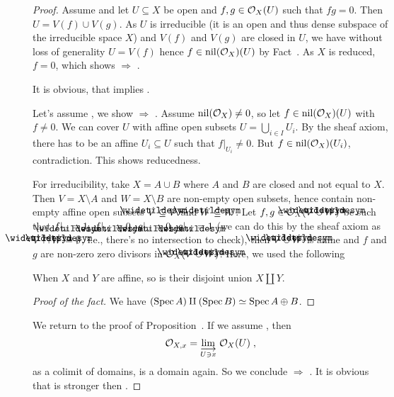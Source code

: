 \documentclass[a4paper,parskip=half,numbers=enddot, DIV=12]{scrreprt}
\begin{document}
\begin{proof}
    Assume  and let $U\subseteq X$ be open and $f,g\in \mathcal{O}_X(U)$ such that $fg = 0$. Then $U = V(f)\cup V(g)$. As $U$ is irreducible (it is an open and thus dense subspace of the irreducible space $X$) and $V(f)$ and $V(g)$ are closed in $U$, we have without loss of generality $U = V(f)$ hence $f\in\operatorname{nil}(\mathcal{O}_X)(U)$ by Fact~. As $X$ is reduced, $f=0$, which shows  $\Rightarrow$ .
    
    It is obvious, that  implies .
    
    Let's assume , we show  $\Rightarrow$ . Assume $\operatorname{nil}(\mathcal{O}_X) \neq 0$, so let $f\in \operatorname{nil}(\mathcal{O}_X)(U)$ with $f\neq 0$. We can cover $U$ with affine open subsets $U=\bigcup_{i\in I}U_i$. By the sheaf axiom, there has to be an affine $U_i \subseteq U$ such that $f|_{U_i} \neq 0$. But $f\in \operatorname{nil}(\mathcal{O}_X)(U_i)$, contradiction. This shows reducedness. 
    
    For irreducibility, take $X=A\cup B$ where $A$ and $B$ are closed and not equal to $X$. Then $V=X\setminus A$ and $W= X\setminus B$ are non-empty open subsets, hence contain non-empty affine open subsets $\snake V \subseteq V$ and $\snake W \subseteq W$. Let $f,g\in \Oo_X(\snake V\cup\snake W)$ be such that $f|_{\snake V} = 1$, $f|_{\snake W} = 0$, $g|_{\snake V} = 0$, $g|_{\snake W} = 1$ (we can do this by the sheaf axiom as $\snake V\cap\snake W=\emptyset$, i.e., there's no intersection to check), then $\snake V\cup \snake W$ is affine and $f$ and $g$ are non-zero zero divisors in $\Oo_X(\snake V\cup \snake W)$. Here, we used the following 
    \begin{fact*}
    	When $X$ and $Y$ are affine, so is their disjoint union $X\amalg Y$.
    \end{fact*}
    \begin{proof}[Proof of the fact] 
    	We have $(\operatorname{Spec} A) \amalg (\operatorname{Spec} B) \simeq \operatorname{Spec} A\oplus B$.
    \end{proof}
    
    We return to the proof of Proposition~. If we assume , then 
    \begin{align*}
        \Oo_{X,x} = \colimit[U\ni x] \Oo_X(U)\;,
    \end{align*}
    as a colimit of domains, is a domain again. So we conclude  $\Rightarrow$ . It is obvious that  is stronger then .
    

\end{proof}
\end{document}
